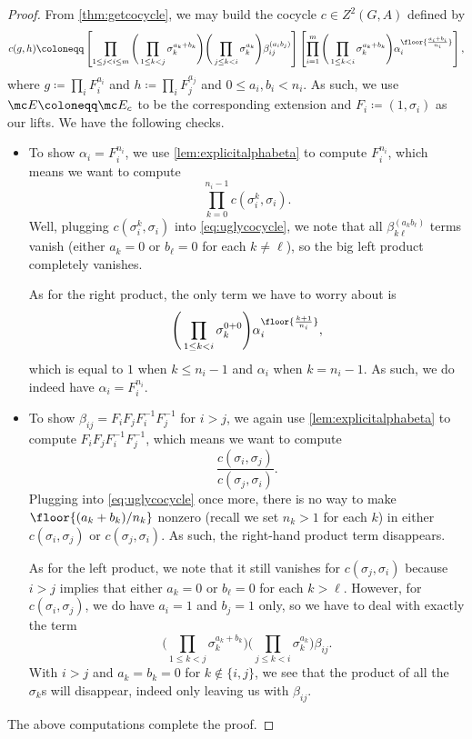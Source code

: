 \documentclass{article}
\numberwithin{equation}{section}
\begin{document}
\begin{proof}
	From \autoref{thm:getcocycle}, we may build the cocycle $c\in Z^2( G,A)$ defined by
	\begin{equation}
		c(g,h)\coloneqq\left[\prod_{1\le j<i\le m}\Bigg(\prod_{1\le k<j}\sigma_k^{a_k+b_k}\Bigg)\Bigg(\prod_{j\le k<i}\sigma_k^{a_k}\Bigg)\beta_{ij}^{(a_ib_j)}\right]\left[\prod_{i=1}^m\Bigg(\prod_{1\le k<i}\sigma_k^{a_k+b_k}\Bigg)\alpha_i^{\floor{\frac{a_i+b_i}{n_i}}}\right], \label{eq:uglycocycle}
	\end{equation}
	where $g\coloneqq\prod_iF_i^{a_i}$ and $h\coloneqq\prod_iF_j^{a_j}$ and $0\le a_i,b_i<n_i$. As such, we use $\mc E\coloneqq\mc E_c$ to be the corresponding extension and $F_i\coloneqq(1,\sigma_i)$ as our lifts. We have the following checks.
	\begin{itemize}
		\item To show $\alpha_i=F_i^{n_i}$, we use \autoref{lem:explicitalphabeta} to compute $F_i^{n_i}$, which means we want to compute
		\[\prod_{k=0}^{n_i-1}c\left(\sigma_i^k,\sigma_i\right).\]
		Well, plugging $c\left(\sigma_i^k,\sigma_i\right)$ into \autoref{eq:uglycocycle}, we note that all $\beta_{k\ell}^{(a_kb_\ell)}$ terms vanish (either $a_k=0$ or $b_\ell=0$ for each $k\ne\ell$), so the big left product completely vanishes.
		
		As for the right product, the only term we have to worry about is
		\[\Bigg(\prod_{1\le k<i}\sigma_k^{0+0}\Bigg)\alpha_i^{\floor{\frac{k+1}{n_i}}},\]
		which is equal to $1$ when $k\le n_i-1$ and $\alpha_i$ when $k=n_i-1$. As such, we do indeed have $\alpha_i=F_i^{n_i}$.
		\item To show $\beta_{ij}=F_iF_jF_i^{-1}F_j^{-1}$ for $i>j$, we again use \autoref{lem:explicitalphabeta} to compute $F_iF_jF_i^{-1}F_j^{-1}$, which means we want to compute
		\[\frac{c(\sigma_i,\sigma_j)}{c(\sigma_j,\sigma_i)}.\]
		Plugging into \autoref{eq:uglycocycle} once more, there is no way to make $\floor{(a_k+b_k)/n_k}$ nonzero (recall we set $n_k>1$ for each $k$) in either $c(\sigma_i,\sigma_j)$ or $c(\sigma_j,\sigma_i)$. As such, the right-hand product term disappears.

		As for the left product, we note that it still vanishes for $c(\sigma_j,\sigma_i)$ because $i>j$ implies that either $a_k=0$ or $b_\ell=0$ for each $k>\ell$. However, for $c(\sigma_i,\sigma_j)$, we do have $a_i=1$ and $b_j=1$ only, so we have to deal with exactly the term
		\[\Bigg(\prod_{1\le k<j}\sigma_k^{a_k+b_k}\Bigg)\Bigg(\prod_{j\le k<i}\sigma_k^{a_k}\Bigg)\beta_{ij}.\]
		With $i>j$ and $a_k=b_k=0$ for $k\notin\{i,j\}$, we see that the product of all the $\sigma_k$s will disappear, indeed only leaving us with $\beta_{ij}$.
	\end{itemize}
	The above computations complete the proof.
\end{proof}
\end{document}
